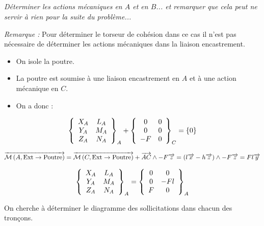 \documentclass[10pt,fleqn]{article} %
\begin{document}
\begin{multicols}{1}
\subparagraph{}
\textit{Déterminer les actions mécaniques en $A$ et en $B$... et remarquer que cela peut ne servir à rien pour la suite du problème...}
\ifprof
\begin{corrige}
\textit{Remarque :}
Pour déterminer le torseur de cohésion dans ce cas il n'est pas nécessaire de déterminer les actions mécaniques dans la liaison encastrement.

\begin{itemize}[label=,font=\color{ocre}] 
\item On isole la poutre.
\item La poutre est soumise à une liaison encastrement en $A$ et à une action mécanique en $C$.
\item On a donc :
\end{itemize}
$$
\torseurcol{X_A}{Y_A}{Z_A}{L_A}{M_A}{N_A}{A}
+\torseurcol{0}{0}{-F}{0}{0}{0}{C}
=\{ 0\}
$$

$\vectm{A}{\text{Ext}}{\text{Poutre}}
=\vectm{C}{\text{Ext}}{\text{Poutre}} + \vect{AC}\wedge -F \vect{z}  
= \left(l\vect{x} - h\vect{z} \right) \wedge -F \vect{z}  
= Fl\vect{y}$

$$
\torseurcol{X_A}{Y_A}{Z_A}{L_A}{M_A}{N_A}{A}
= \torseurcol{0}{0}{F}{0}{-Fl}{0}{A}
$$

\end{corrige}
\else 
\fi


On cherche à déterminer le diagramme des sollicitations dans chacun des tronçons.


\end{multicols}
\end{document}
